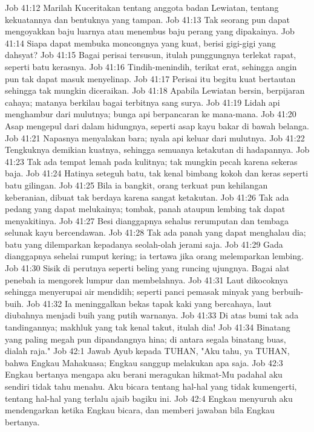 Job 41:12  Marilah Kuceritakan tentang anggota badan Lewiatan, tentang kekuatannya dan bentuknya yang tampan.
Job 41:13  Tak seorang pun dapat mengoyakkan baju luarnya atau menembus baju perang yang dipakainya.
Job 41:14  Siapa dapat membuka moncongnya yang kuat, berisi gigi-gigi yang dahsyat?
Job 41:15  Bagai perisai tersusun, itulah punggungnya terlekat rapat, seperti batu kerasnya.
Job 41:16  Tindih-menindih, terikat erat, sehingga angin pun tak dapat masuk menyelinap.
Job 41:17  Perisai itu begitu kuat bertautan sehingga tak mungkin diceraikan.
Job 41:18  Apabila Lewiatan bersin, berpijaran cahaya; matanya berkilau bagai terbitnya sang surya.
Job 41:19  Lidah api menghambur dari mulutnya; bunga api berpancaran ke mana-mana.
Job 41:20  Asap mengepul dari dalam hidungnya, seperti asap kayu bakar di bawah belanga.
Job 41:21  Napasnya menyalakan bara; nyala api keluar dari mulutnya.
Job 41:22  Tengkuknya demikian kuatnya, sehingga semuanya ketakutan di hadapannya.
Job 41:23  Tak ada tempat lemah pada kulitnya; tak mungkin pecah karena sekeras baja.
Job 41:24  Hatinya seteguh batu, tak kenal bimbang kokoh dan keras seperti batu gilingan.
Job 41:25  Bila ia bangkit, orang terkuat pun kehilangan keberanian, dibuat tak berdaya karena sangat ketakutan.
Job 41:26  Tak ada pedang yang dapat melukainya; tombak, panah ataupun lembing tak dapat menyakitinya.
Job 41:27  Besi dianggapnya sehalus rerumputan dan tembaga selunak kayu bercendawan.
Job 41:28  Tak ada panah yang dapat menghalau dia; batu yang dilemparkan kepadanya seolah-olah jerami saja.
Job 41:29  Gada dianggapnya sehelai rumput kering; ia tertawa jika orang melemparkan lembing.
Job 41:30  Sisik di perutnya seperti beling yang runcing ujungnya. Bagai alat penebah ia mengorek lumpur dan membelahnya.
Job 41:31  Laut dikocoknya sehingga menyerupai air mendidih; seperti panci pemasak minyak yang berbuih-buih.
Job 41:32  Ia meninggalkan bekas tapak kaki yang bercahaya, laut diubahnya menjadi buih yang putih warnanya.
Job 41:33  Di atas bumi tak ada tandingannya; makhluk yang tak kenal takut, itulah dia!
Job 41:34  Binatang yang paling megah pun dipandangnya hina; di antara segala binatang buas, dialah raja."
Job 42:1  Jawab Ayub kepada TUHAN, "Aku tahu, ya TUHAN, bahwa Engkau Mahakuasa; Engkau sanggup melakukan apa saja.
Job 42:3  Engkau bertanya mengapa aku berani meragukan hikmat-Mu padahal aku sendiri tidak tahu menahu. Aku bicara tentang hal-hal yang tidak kumengerti, tentang hal-hal yang terlalu ajaib bagiku ini.
Job 42:4  Engkau menyuruh aku mendengarkan ketika Engkau bicara, dan memberi jawaban bila Engkau bertanya.

